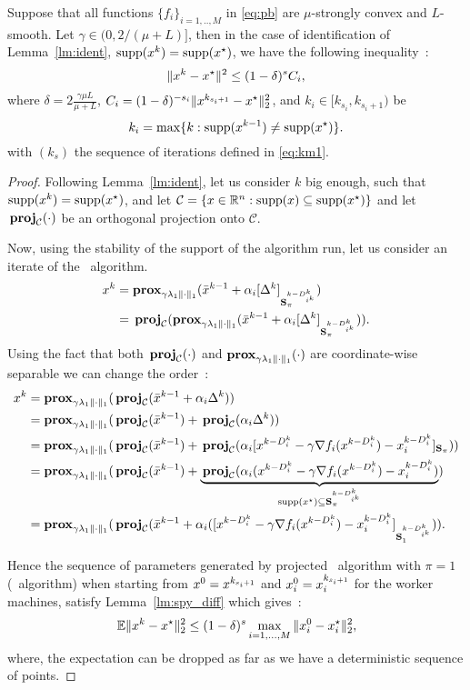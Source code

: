 \begin{theorem}\label{th:rate_after}
Suppose that all functions $\{f_i\}_{i=1,..,M}$ in \eqref{eq:pb} are $\mu$-strongly convex and $L$-smooth. Let $\gamma \in (0,2/(\mu+L)]$, then in the case of identification of Lemma~\ref{lm:ident}, $\mathrm{supp}(x^k) = \mathrm{supp}(x^\star)$, we have the following inequality~:
\begin{equation}\label{eq:dif_prob}
   \|x^k - x^\star\|^2 
 \leq  (1-\delta)^s C_i,
\end{equation}
where $\delta = 2\frac{\gamma \mu L}{\mu+L}$, $C_i = (1-\delta)^{-s_i}\|x^{k_{s_i+1}} - x^\star\|_2^2$, and $k_i\in[k_{s_i}, k_{s_i+1})$ be 
\[
k_i = \max\{k:\mathrm{supp}(x^{k-1})\neq\mathrm{supp}(x^\star)\}.
\]
with $(k_s)$ the sequence of iterations defined in \eqref{eq:km1}.
\end{theorem}
\begin{proof}
Following Lemma~\ref{lm:ident}, let us consider $k$ big enough, such that $\mathrm{supp}(x^k) = \mathrm{supp}(x^\star)$, and let $\mathcal{C} = \{x\in\mathbb{R}^n:\mathrm{supp}(x)\subseteq\mathrm{supp}(x^\star)\}$
and let $\cproj(\cdot)$ be an orthogonal projection onto $\mathcal{C}$.

Now, using the stability of the support of the algorithm run, let us consider an iterate of the \SP~algorithm.
\begin{align*}
\w^k &= \lprox(\barw^{k-1} + \alpha_i[\Delta^k]_{\mask^{k-D_{i^k}^k}}) \\
&= \cproj(\lprox(\barw^{k-1} + \alpha_i[\Delta^k]_{\mask^{k-D_{i^k}^k}})).
\end{align*}
Using the fact that both $\cproj(\cdot)$ and $\mathbf{prox}_{\gamma \lambda_1\|\cdot\|_1}(\cdot)$ are coordinate-wise separable we can change the order~:
\begin{align*}\label{eq:projected_algo}
 \w^k &= \lprox(\cproj(\barw^{k-1} + \alpha_i\Delta^k))\nonumber\\
 &= \lprox(\cproj(\barw^{k-1}) + \cproj(\alpha_i\Delta^k))\nonumber\\
 &= \lprox(\cproj(\barw^{k-1}) + \cproj(\alpha_i[  \w^{k-D_i^k} - \gamma \nabla f_i( \w^{k-D_i^k}) - \w_i^{k-D_i^k}]_{\mask}))\nonumber\\
 &  = \lprox(\cproj(\barw^{k-1}) + \underbrace{\cproj(\alpha_i(\w^{k-D_i^k} - \gamma \nabla f_i( \w^{k-D_i^k}) - \w_i^{k-D_i^k})}_{\supp(x^\star)\subseteq \mask^{k-D_{i^k}^k}})\nonumber\\
 & = \lprox(\cproj(\barw^{k-1} + \alpha_i([\w^{k-D_i^k} - \gamma \nabla f_i( \w^{k-D_i^k}) - \w_i^{k-D_i^k}]_{\fullmask^{k-D_{i^k}^k}})).
\end{align*}

Hence the sequence of parameters generated by projected \SP~algorithm with $\pi = 1$ (\dave~algorithm) when starting from $x^0 = x^{k_{s_i+1}}$ and  $x^0_i = x_i^{k_{s_i+1}}$ for the worker machines, satisfy Lemma~\ref{lm:spy_diff} which gives~: 
\[
\mathbb{E}\|x^k-x^\star\|_2^2\leq(1-\delta)^s\max_{i=1,\dots,M}\|x_i^0-x_i^\star\|_2^2,
\]
where, the expectation can be dropped as far as we have a deterministic sequence of points.
\end{proof}

